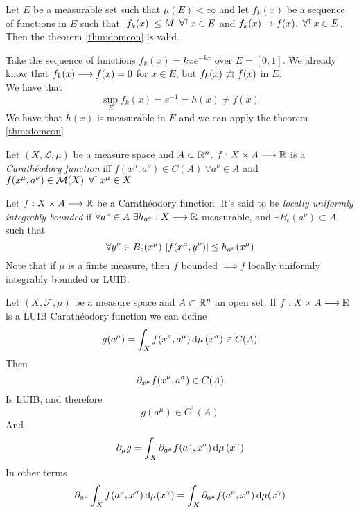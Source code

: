 \documentclass[../complete.tex]{subfiles}
\begin{document}
\begin{cor}
	Let $E$ be a measurable set such that $\mu\left( E \right)<\infty$ and let $f_k(x)$ be a sequence of functions in $E$ such that $\abs{f_k(x)}\le M\ \operatorname{\forall^\dagger} x\in E$ and $f_k(x)\to f(x),\ \operatorname{\forall^\dagger} x\in E$. Then the theorem \eqref{thm:domcon} is valid.
\end{cor}
\begin{eg}
	Take the sequence of functions $f_k(x)=kxe^{-kx}$ over $E=[0,1]$. We already know that $f_k(x)\overset{}{\longrightarrow} f(x)=0$ for $x\in E$, but $f_k(x)\not\rightrightarrows f(x)$ in $E$.\\
	We have that
	\begin{equation*}
		\sup_Ef_k(x)=e^{-1}=h(x)\ne f(x)
	\end{equation*}
	We have that $h(x)$ is measurable in $E$ and we can apply the theorem \eqref{thm:domcon}
\end{eg}
\begin{dfn}
	Let $(X,\mathcal{L},\mu)$ be a measure space and $A\subset\mathbb{R}^n$. $f:X\times A\overset{}{\longrightarrow}\mathbb{R}$ is a \textit{Carathéodory function} iff $f(x^\mu,a^\nu)\in C(A)\ \forall a^\nu\in A$ and $f(x^\mu,a^\nu)\in\mathcal{M}(X)\ \operatorname{\forall^\dagger} x^\mu\in X$
\end{dfn}
\begin{dfn}
	Let $f:X\times A\overset{}{\longrightarrow}\mathbb{R}$ be a Carathéodory function. It's said to be \textit{locally uniformly integrably bounded} if $\forall a^\nu\in A\ \exists h_{a^\nu}:X\overset{}{\longrightarrow}\mathbb{R}$ measurable, and $\exists B_\epsilon(a^\nu)\subset A$, such that
	\begin{equation*}
		\forall y^\nu\in B_\epsilon(x^\mu)\ \abs{f(x^\mu,y^\nu)}\le h_{a^\nu}(x^\mu)
	\end{equation*}
	Note that if $\mu$ is a finite measure, then $f$ bounded $\implies f$ locally uniformly integrably bounded or LUIB.
\end{dfn}
\begin{thm}
	Let $(X,\mathcal{F},\mu)$ be a measure space and $A\subset\mathbb{R}^n$ an open set. If $f:X\times A\overset{}{\longrightarrow}\mathbb{R}$ is a LUIB Carathéodory function we can define
	\begin{equation*}
		g(a^\mu)=\int_{X}^{}f(x^\nu,a^\mu)\operatorname{d\!}\mu\left( x^\sigma \right)\in C(A)
	\end{equation*}
	Then
	\begin{equation*}
		\partial_{x^\mu}f(x^\nu,a^\sigma)\in C(A)
	\end{equation*}
	Is LUIB, and therefore
	\begin{equation*}
		g(a^\mu)\in C^1(A)
	\end{equation*}
	And
	\begin{equation*}
		\partial_\mu g=\int_{X}^{}\partial_{a^\mu}f(a^\nu,x^\sigma)\operatorname{d\!}\mu\left( x^\gamma \right)
	\end{equation*}
	In other terms
	\begin{equation}
		\partial_{a^\mu}\int_{X}^{}f(a^\nu,x^\sigma)\operatorname{d\!}\mu(x^\gamma)=\int_{X}^{}\partial_{a^\mu}f(a^\nu,x^\sigma)\operatorname{d\!}\mu(x^\gamma)
		\label{eq:leibnizrule}
	\end{equation}
\end{thm}
\end{document}
